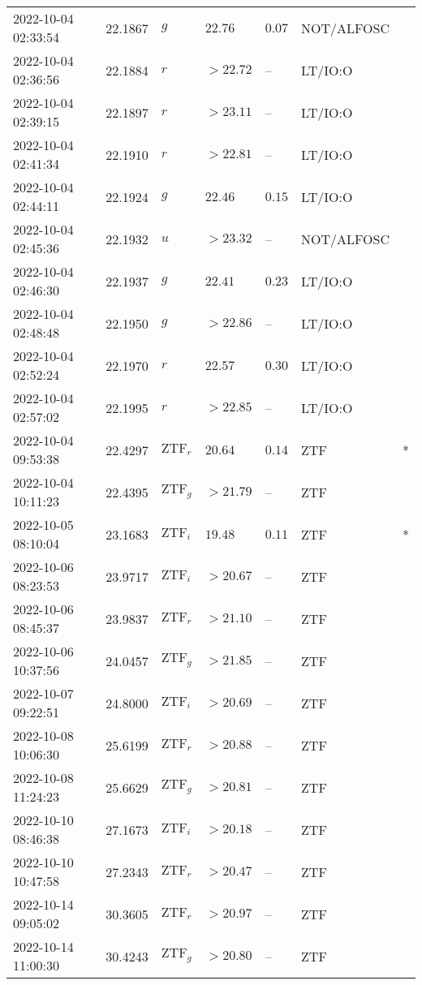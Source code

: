 \documentclass{nature_plusfigure}
\begin{document}
\begin{supplement}
\begin{center}
\begin{longtable}{lllllll}
2022-10-04 02:33:54 & 22.1867 & $g$ & $22.76$ & $0.07$ & NOT/ALFOSC &  \\ 
2022-10-04 02:36:56 & 22.1884 & $r$ & $>22.72$ & -- & LT/IO:O &  \\ 
2022-10-04 02:39:15 & 22.1897 & $r$ & $>23.11$ & -- & LT/IO:O &  \\ 
2022-10-04 02:41:34 & 22.1910 & $r$ & $>22.81$ & -- & LT/IO:O &  \\ 
2022-10-04 02:44:11 & 22.1924 & $g$ & $22.46$ & $0.15$ & LT/IO:O &  \\ 
2022-10-04 02:45:36 & 22.1932 & $u$ & $>23.32$ & -- & NOT/ALFOSC &  \\ 
2022-10-04 02:46:30 & 22.1937 & $g$ & $22.41$ & $0.23$ & LT/IO:O &  \\ 
2022-10-04 02:48:48 & 22.1950 & $g$ & $>22.86$ & -- & LT/IO:O &  \\ 
2022-10-04 02:52:24 & 22.1970 & $r$ & $22.57$ & $0.30$ & LT/IO:O &  \\ 
2022-10-04 02:57:02 & 22.1995 & $r$ & $>22.85$ & -- & LT/IO:O &  \\ 
2022-10-04 09:53:38 & 22.4297 & $\mathrm{ZTF}_{r}$ & $20.64$ & $0.14$ & ZTF & * \\ 
2022-10-04 10:11:23 & 22.4395 & $\mathrm{ZTF}_{g}$ & $>21.79$ & -- & ZTF &  \\ 
2022-10-05 08:10:04 & 23.1683 & $\mathrm{ZTF}_{i}$ & $19.48$ & $0.11$ & ZTF & * \\ 
2022-10-06 08:23:53 & 23.9717 & $\mathrm{ZTF}_{i}$ & $>20.67$ & -- & ZTF &  \\ 
2022-10-06 08:45:37 & 23.9837 & $\mathrm{ZTF}_{r}$ & $>21.10$ & -- & ZTF &  \\ 
2022-10-06 10:37:56 & 24.0457 & $\mathrm{ZTF}_{g}$ & $>21.85$ & -- & ZTF &  \\ 
2022-10-07 09:22:51 & 24.8000 & $\mathrm{ZTF}_{i}$ & $>20.69$ & -- & ZTF &  \\ 
2022-10-08 10:06:30 & 25.6199 & $\mathrm{ZTF}_{r}$ & $>20.88$ & -- & ZTF &  \\ 
2022-10-08 11:24:23 & 25.6629 & $\mathrm{ZTF}_{g}$ & $>20.81$ & -- & ZTF &  \\ 
2022-10-10 08:46:38 & 27.1673 & $\mathrm{ZTF}_{i}$ & $>20.18$ & -- & ZTF &  \\ 
2022-10-10 10:47:58 & 27.2343 & $\mathrm{ZTF}_{r}$ & $>20.47$ & -- & ZTF &  \\ 
2022-10-14 09:05:02 & 30.3605 & $\mathrm{ZTF}_{r}$ & $>20.97$ & -- & ZTF &  \\ 
2022-10-14 11:00:30 & 30.4243 & $\mathrm{ZTF}_{g}$ & $>20.80$ & -- & ZTF &  \\ 

\end{longtable}
\end{center}
\end{supplement}
\end{document}
